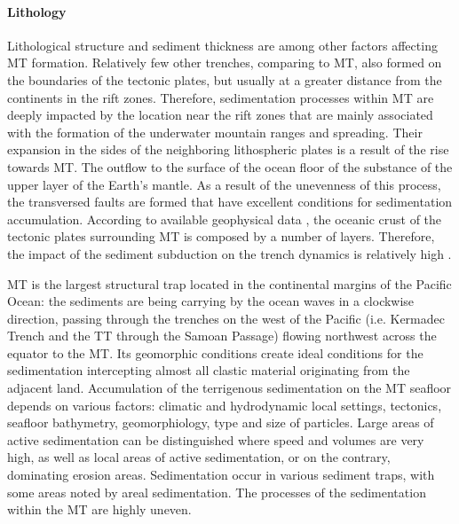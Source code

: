 \documentclass[11pt,a4paper]{report}
\begin{document}
\paragraph{Lithology}
Lithological structure and sediment thickness are among other factors affecting \ac{MT} formation. Relatively few other trenches, comparing to \ac{MT}, also formed on the boundaries of the tectonic plates, but usually at a greater distance from the continents in the rift zones. Therefore, sedimentation processes within \ac{MT} are deeply impacted by the location near the rift zones that are mainly associated with the formation of the underwater mountain ranges and spreading. Their expansion in the sides of the neighboring lithospheric plates is a result of the rise towards \ac{MT}. The outflow to the surface of the ocean floor of the substance of the upper layer of the Earth's mantle. As a result of the unevenness of this process, the transversed faults are formed that have excellent conditions for sedimentation accumulation. According to available geophysical data \cite{DubininUshakov2001}, the oceanic crust of the tectonic plates surrounding \ac{MT} is composed by a number of layers. Therefore, the impact of the sediment subduction on the trench dynamics is relatively high \cite{HorlestonHelffrich2012}.

\ac{MT} is the largest structural trap located in the continental margins of the Pacific Ocean: the sediments are being carrying by the ocean waves in a clockwise direction, passing through the trenches on the west of the Pacific (i.e. Kermadec Trench and the \ac{TT} through the Samoan Passage) flowing northwest across the equator to the \ac{MT}. Its geomorphic conditions create ideal conditions for the sedimentation intercepting almost all clastic material originating from the adjacent land. Accumulation of the terrigenous sedimentation on the \ac{MT} seafloor depends on various factors: climatic and hydrodynamic local settings, tectonics, seafloor bathymetry, geomorphiology, type and size of particles. Large areas of active sedimentation can be distinguished where speed and volumes are very high, as well as local areas of active sedimentation, or on the contrary, dominating erosion areas. Sedimentation occur in various sediment traps, with some areas noted by areal sedimentation. The processes of the sedimentation within the \ac{MT} are highly uneven.
\end{document}
